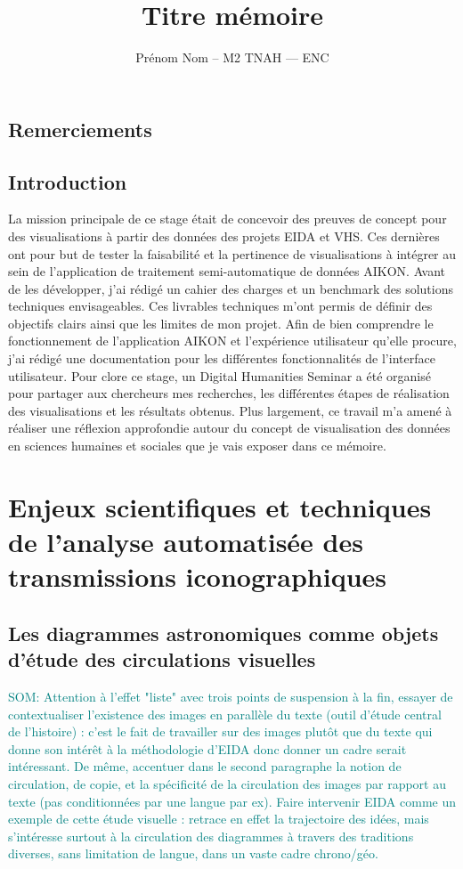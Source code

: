 \documentclass[a4paper,12pt,twoside]{book}
\author{Prénom Nom – M2 TNAH — ENC}
\title{Titre mémoire}
\newcommand\chapterNo[1]{
	\chapter*{#1}
	\markright{\MakeUppercase{#1}}
}
\newcommand{\som}[1]{\textcolor{teal}{SOM: #1}}
\begin{document}
	
	\onehalfspacing 
	
	\frontmatter
	
	
	
	\thispagestyle{empty}	
	\cleardoublepage
	
	
	
	\chapterNo{Remerciements}
	
	\chapterNo{Introduction}
	
	La mission principale de ce stage était de concevoir des preuves de concept pour des visualisations à partir des données des projets EIDA et VHS. Ces dernières ont pour but de tester la faisabilité et la pertinence de visualisations à intégrer au sein de l’application de traitement semi-automatique de données AIKON. Avant de les développer, j’ai rédigé un cahier des charges et un benchmark des solutions techniques envisageables. Ces livrables techniques m’ont permis de définir des objectifs clairs ainsi que les limites de mon projet. Afin de bien comprendre le fonctionnement de l’application AIKON et l’expérience utilisateur qu’elle procure, j’ai rédigé une documentation pour les différentes fonctionnalités de l’interface utilisateur. Pour clore ce stage, un Digital Humanities Seminar a été organisé pour partager aux chercheurs mes recherches, les différentes étapes de réalisation des visualisations et les résultats obtenus. Plus largement, ce travail m’a amené à réaliser une réflexion approfondie autour du concept de visualisation des données en sciences humaines et sociales que je vais exposer dans ce mémoire. 
	
	
	\thispagestyle{empty}
	\cleardoublepage
	
	\mainmatter
	
	\part{Enjeux scientifiques et techniques de l'analyse automatisée des transmissions iconographiques}

	
	\chapter[Les diagrammes astronomiques]{Les diagrammes astronomiques comme objets d'étude des circulations visuelles}
	
		\som{Attention à l'effet "liste" avec trois points de suspension à la fin, essayer de contextualiser l'existence des images en parallèle du texte (outil d'étude central de l'histoire) : c'est le fait de travailler sur des images plutôt que du texte qui donne son intérêt à la méthodologie d'EIDA donc donner un cadre serait intéressant. De même, accentuer dans le second paragraphe la notion de circulation, de copie, et la spécificité de la circulation des images par rapport au texte (pas conditionnées par une langue par ex). Faire intervenir EIDA comme un exemple de cette étude visuelle : retrace en effet la trajectoire des idées, mais s'intéresse surtout à la circulation des diagrammes à travers des traditions diverses, sans limitation de langue, dans un vaste cadre chrono/géo.}
	
\end{document}
